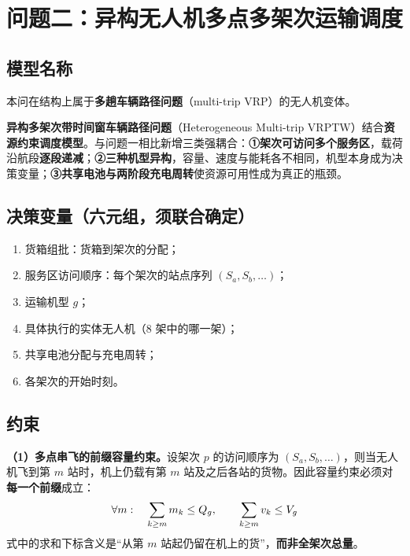 \section{问题二：异构无人机多点多架次运输调度}\label{sec:q2}

\subsection{模型名称}

本问在结构上属于\textbf{多趟车辆路径问题}（multi-trip VRP）的无人机变体\cite{choi2019multitrip,luo2017twoechelon,yang2025lodbo}。

\textbf{异构多架次带时间窗车辆路径问题}（Heterogeneous Multi-trip VRPTW）结合\textbf{资源约束调度模型}。与问题一相比新增三类强耦合：\textbf{①架次可访问多个服务区}，载荷沿航段\textbf{逐段递减}；\textbf{②三种机型异构}，容量、速度与能耗各不相同，机型本身成为决策变量；\textbf{③共享电池与两阶段充电周转}使资源可用性成为真正的瓶颈。

\subsection{决策变量（六元组，须联合确定）}

\begin{enumerate}[label=(\arabic*),leftmargin=2em]
	\item 货箱组批：货箱到架次的分配；
	\item 服务区访问顺序：每个架次的站点序列 $(S_a,S_b,\dots)$；
	\item 运输机型 $g$；
	\item 具体执行的实体无人机（8 架中的哪一架）；
	\item 共享电池分配与充电周转；
	\item 各架次的开始时刻。
\end{enumerate}

\subsection{约束}

\textbf{（1）多点串飞的前缀容量约束。}设架次 $p$ 的访问顺序为 $(S_a,S_b,\dots)$，则当无人机飞到第 $m$ 站时，机上仍载有第 $m$ 站及之后各站的货物。因此容量约束必须对\textbf{每一个前缀}成立：
\begin{equation}
	\forall m:\quad\sum_{k\ge m}m_{k}\le Q_{g},\qquad
	\sum_{k\ge m}v_{k}\le V_{g}
	\label{eq:prefix}
\end{equation}
式中的求和下标含义是“从第 $m$ 站起仍留在机上的货”，\textbf{而非全架次总量}。

